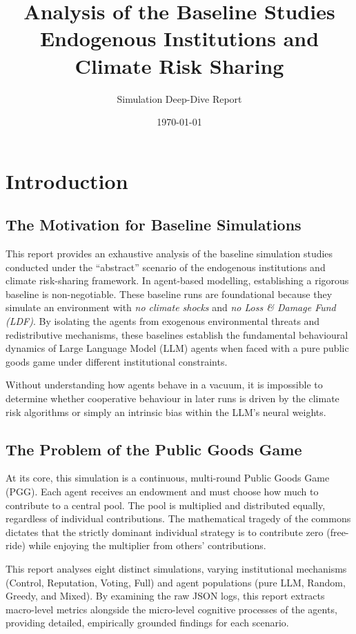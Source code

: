 \documentclass[11pt,a4paper]{article}
\title{\textbf{Analysis of the Baseline Studies} \\ \Large Endogenous Institutions and Climate Risk Sharing}
\author{Simulation Deep-Dive Report}
\date{\today}
\begin{document}
\maketitle
\tableofcontents
\newpage

\section{Introduction}

\subsection{The Motivation for Baseline Simulations}
This report provides an exhaustive analysis of the baseline simulation studies conducted under the ``abstract'' scenario of the endogenous institutions and climate risk-sharing framework. In agent-based modelling, establishing a rigorous baseline is non-negotiable. These baseline runs are foundational because they simulate an environment with \textit{no climate shocks} and \textit{no Loss \& Damage Fund (LDF)}. By isolating the agents from exogenous environmental threats and redistributive mechanisms, these baselines establish the fundamental behavioural dynamics of Large Language Model (LLM) agents when faced with a pure public goods game under different institutional constraints. 

Without understanding how agents behave in a vacuum, it is impossible to determine whether cooperative behaviour in later runs is driven by the climate risk algorithms or simply an intrinsic bias within the LLM's neural weights. 

\subsection{The Problem of the Public Goods Game}
At its core, this simulation is a continuous, multi-round Public Goods Game (PGG). Each agent receives an endowment and must choose how much to contribute to a central pool. The pool is multiplied and distributed equally, regardless of individual contributions. The mathematical tragedy of the commons dictates that the strictly dominant individual strategy is to contribute zero (free-ride) while enjoying the multiplier from others' contributions. 

This report analyses eight distinct simulations, varying institutional mechanisms (Control, Reputation, Voting, Full) and agent populations (pure LLM, Random, Greedy, and Mixed). By examining the raw JSON logs, this report extracts macro-level metrics alongside the micro-level cognitive processes of the agents, providing detailed, empirically grounded findings for each scenario.
\end{document}
